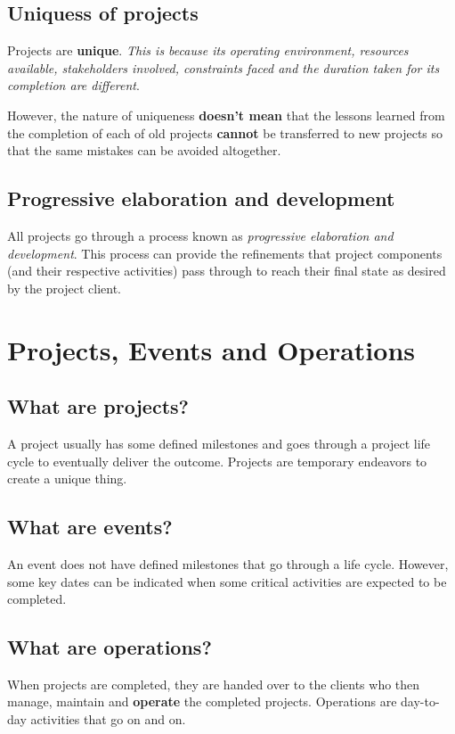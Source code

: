 \documentclass[math,code]{amznotes}
\theoremstyle{remark}
\begin{document}
\subsection{Uniquess of projects}
Projects are \textbf{unique}. \textit{This is because its operating environment, resources available, stakeholders involved, constraints faced and the duration taken for its completion are different}.

However, the nature of uniqueness \textbf{doesn't mean} that the lessons learned from the completion of each of old projects \textbf{cannot} be transferred to new projects so that the same mistakes can be avoided altogether.

\subsection{Progressive elaboration and development}
All projects go through a process known as \textit{progressive elaboration and development}. This process can provide the refinements that project components (and their respective activities) pass through to reach their final state as desired by the project client.

\section{Projects, Events and Operations}
\subsection{What are projects?}
A project usually has some defined milestones and goes through a project life cycle to eventually deliver the outcome. Projects are temporary endeavors to create a unique thing.

\subsection{What are events?}
An event does not have defined milestones that go through a life cycle. However, some key dates can be indicated when some critical activities are expected to be completed.

\subsection{What are operations?}
When projects are completed, they are handed over to the clients who then manage, maintain and \textbf{operate} the completed projects. Operations are day-to-day activities that go on and on.
\end{document}

